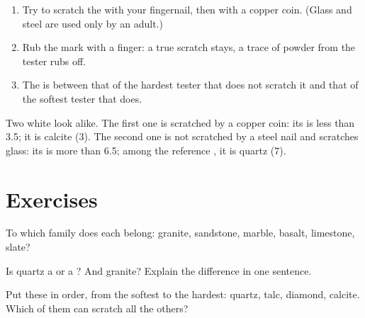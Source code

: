 \begin{method}\label{met:g6:rocks-and-minerals:scratch}
\begin{enumerate}
  \item Try to scratch the  with your fingernail, then with a copper
        coin. (Glass and steel are used only by an adult.)
  \item Rub the mark with a finger: a true scratch stays, a trace of powder
        from the tester rubs off.
  \item The  is between that of the hardest tester that does not
        scratch it and that of the softest tester that does.
\end{enumerate}
\end{method}

\begin{example}\label{ex:g6:rocks-and-minerals:quartz-calcite}
Two white  look alike. The first one is scratched by a copper coin:
its  is less than 3.5; it is calcite (3). The second one is not
scratched by a steel nail and scratches glass: its  is more than
6.5; among the reference , it is quartz (7).
\end{example}

\section{Exercises}

\begin{exercise}[$\star$]\label{exo:g6:rocks-and-minerals:1}
To which family does each  belong: granite, sandstone, marble, basalt,
limestone, slate?
\end{exercise}

\begin{exercise}[$\star$]\label{exo:g6:rocks-and-minerals:2}
Is quartz a  or a ? And granite? Explain the difference in one
sentence.
\end{exercise}

\begin{exercise}[$\star$]\label{exo:g6:rocks-and-minerals:3}
Put these  in order, from the softest to the hardest: quartz,
talc, diamond, calcite. Which of them can scratch all the others?
\end{exercise}

